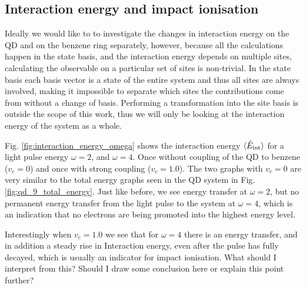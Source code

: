 \subsection{Interaction energy and impact ionisation}
Ideally we would like to to investigate the changes in interaction energy on the QD and on the benzene ring separately, however, because all the calculations happen in the state basis, and the interaction energy depends on multiple sites, calculating the observable on a particular set of sites is non-trivial. In the state basis each basis vector is a state of the entire system and thus all sites are always involved, making it impossible to separate which sites the contributions come from without a change of basis. Performing a transformation into the site basis is outside the scope of this work, thus we will only be looking at the interaction energy of the system as a whole.
\medskip

Fig. \ref{fig:interaction_energy_omega} shows the interaction energy $\braket{\hat{E}_{\rm int}}$ for a light pulse energy $\omega = 2$, and $\omega=4$. Once without coupling of the QD to benzene ($v_c=0$) and once with strong coupling ($v_c=1.0$). The two graphs with $v_c=0$ are very similar to the total energy graphs seen in the QD system in Fig. \ref{fig:qd_9_total_energy}. Just like before, we see energy transfer at $\omega = 2$, but no permanent energy transfer from the light pulse to the system at $\omega = 4$, which is an indication that no electrons are being promoted into the highest energy level.
\medskip

Interestingly when $v_c = 1.0$ we see that for $\omega=4$ there is an energy transfer, and in addition a steady rise in Interaction energy, even after the pulse has fully decayed, which is usually an indicator for impact ionisation. \color{red} What should I interpret from this? Should I draw some conclusion here or explain this point further?\color{black}

